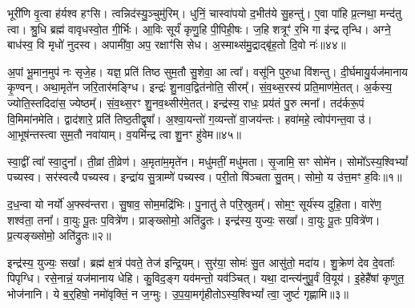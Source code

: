 भूरी॑णि वृ॒त्वा ह॑र्यश्व हꣳसि।
त्वन्निद॑स्यु॒ञ्चुमु॑रिम्।
धुनिं॒ चा\-स्वा॑\-पयो द॒भीत॑ये सु॒हन्तु॑।
ए॒वा पा॑हि प्र॒त्नथा॒ मन्द॑तु त्वा।
श्रु॒धि ब्रह्म॑ वावृधस्वो॒त गी॒र्भिः।
आ॒विः सूर्यं॑ कृणु॒हि पी॒पिही॒षः।
ज॒हि शत्रूꣳ॑ र॒भि गा इ॑न्द्र तृन्धि।
अग्ने॒ बाध॑स्व॒ वि मृधो॑ नुदस्व।
अपामी॑वा॒ अप॒ रक्षाꣳ॑सि सेध।
अ॒स्माथ्स॑मु॒द्राद्बृ॑ह॒तो दि॒वो नः॑॥४४॥

अ॒पां भू॒मान॒मुप॑ नः सृजे॒ह।
यज्ञ॒ प्रति॑ तिष्ठ सुम॒तौ सु॒शेवा॒ आ त्वा᳚।
वसू॑नि पुरु॒धा वि॑शन्तु।
दी॒र्घमायु॒र्यज॑मानाय कृ॒ण्वन्।
अथा॒मृते॑न जरि॒तार॑मङ्ग्धि।
इन्द्रः॑ शु॒नाव॒द्वित॑नोति॒ सीरम्᳚।
सं॒व॒थ्स॒रस्य॑ प्रति॒माण॑मे॒तत्।
अ॒र्कस्य॒ ज्योति॒स्तदिदा॑स॒ ज्येष्ठम्᳚।
सं॒व॒थ्स॒रꣳ शु॒नव॒थ्सीर॑मे॒तत्।
इन्द्र॑स्य॒ राधः॒ प्रय॑तं पु॒रु त्मना᳚।
तद॑र्करू॒पं वि॒मिमा॑नमेति।
द्वाद॑शारे॒ प्रति॑ तिष्ठ॒तीद्वृषा᳚।
अ॒श्वा॒यन्तो॑ ग॒व्यन्तो॑ वा॒जय॑न्तः।
हवा॑महे॒ त्वोप॑गन्त॒वा उ॑।
आ॒भूष॑न्तस्त्वा सुम॒तौ नवा॑याम्।
व॒यमि॑न्द्र त्वा शु॒नꣳ हु॑वेम॥४५॥




\clearpage
{}
\setcounter{anuvakam}{0}

स्वा॒द्वीं त्वा᳚ स्वा॒दुना᳚।
ती॒व्रां ती॒व्रेण॑।
अ॒मृता॑म॒मृते॑न।
मधु॑मतीं॒ मधु॑मता।
सृ॒जामि॒ सꣳ सोमे॑न।
सोमो᳚\-ऽस्य॒श्विभ्यां᳚ पच्यस्व।
सर॑स्वत्यै पच्यस्व।
इन्द्रा॑य सु॒त्राम्णे॑ पच्यस्व।
परी॒तो षि॑ञ्चता सु॒तम्।
सोमो॒ य उ॑त्त॒मꣳ ह॒विः॥१॥

द॒ध॒न्वा यो नर्यो॑ अ॒फ्स्व॑न्तरा।
सु॒षाव॒ सोम॒मद्रि॑भिः।
पु॒नातु॑ ते परि॒स्रुतम्᳚।
सोम॒ꣳ॒ सूर्य॑स्य दुहि॒ता।
वारे॑ण॒ शश्व॑ता॒ तना᳚।
वा॒युः पू॒तः प॒वित्रे॑ण।
प्राङ्ख्सोमो॒ अति॑द्रुतः।
इन्द्र॑स्य॒ युज्यः॒ सखा᳚।
वा॒युः पू॒तः प॒वित्रे॑ण।
प्र॒त्यङ्ख्सोमो॒ अति॑द्रुतः॥२॥

इन्द्र॑स्य॒ युज्यः॒ सखा᳚।
ब्रह्म॑ क्ष॒त्रं प॑वते॒ तेज॑ इन्द्रि॒यम्।
सुर॑या॒ सोमः॑ सु॒त आसु॑तो॒ मदा॑य।
शु॒क्रेण॑ देव दे॒वताः᳚ पिपृग्धि।
रसे॒नान्नं॒ यज॑मानाय धेहि।
कु॒विद॒ङ्ग यव॑मन्तो॒ यव॑ञ्चित्।
यथा॒ दान्त्य॑नुपू॒र्वं वि॒यूय॑।
इ॒हेहै॑षां कृणुत॒ भोज॑नानि।
ये ब॒र्‌॒\mbox{}हिषो॒ नमो॑वृक्तिं॒ न ज॒ग्मुः।
उ॒प॒या॒मगृ॑हीतो\-ऽस्य॒श्विभ्यां᳚ त्वा॒ जुष्टं॑ गृह्णामि॥३॥

